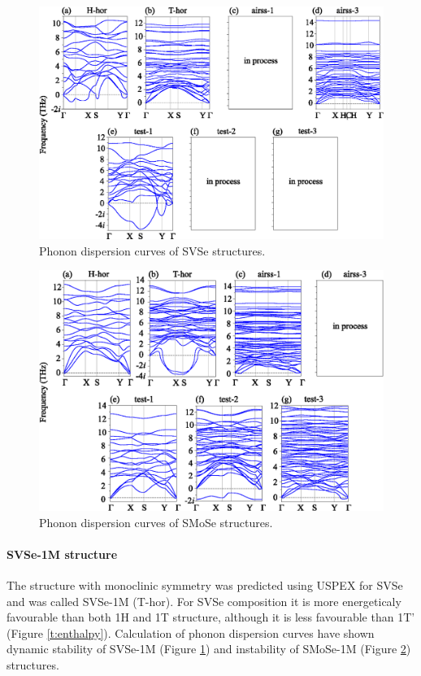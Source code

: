 \documentclass[a4paperm]{article}
\begin{document}
\begin{figure}[H]
	\includegraphics[width=\textwidth]{phon_svse.eps}
	\caption{Phonon dispersion curves of SVSe structures.}
	\label{phon_svse}
\end{figure}


\begin{figure}[H]
	\includegraphics[width=\textwidth]{phon_smose.eps}
	\caption{Phonon dispersion curves of SMoSe structures. }
	\label{phon_smose}
\end{figure}





\paragraph{SVSe-1M structure}

The structure with monoclinic symmetry was predicted using USPEX for SVSe and was called SVSe-1M (T-hor). 
For SVSe composition it is more  energeticaly favourable than both 1H and 1T structure, although it is less favourable than 1T' (Figure \ref{t:enthalpy}).
Calculation of phonon dispersion curves have shown dynamic stability of SVSe-1M (Figure \ref{phon_svse}) and instability of SMoSe-1M (Figure \ref{phon_smose}) structures.
\end{document}
